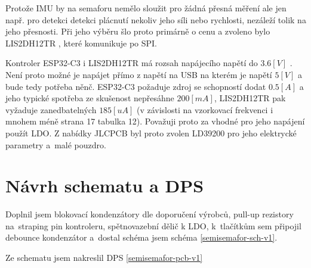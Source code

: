 Protože IMU by na semaforu nemělo sloužit pro žádná přesná měření ale jen např. pro detekci detekci plácnutí nekoliv jeho síli nebo rychlosti, nezáleží tolik na jeho přesnosti.
Při jeho výběru šlo proto primárně o cenu a zvoleno bylo LIS2DH12TR \cite{LIS2DH12TR}, které komunikuje po SPI.

Kontroler ESP32-C3 i LIS2DH12TR má rozsah napájecího napětí do \(3.6 [V]\) \cite{ESP32C3}\cite{LIS2DH12TR}.
Není proto možné je napájet přímo z napětí na USB na kterém je napětí \(5 [V]\) a bude tedy potřeba něnč.
ESP32-C3 požaduje zdroj se schopností dodat \(0.5 [A]\) \cite{ESP32C3} a jeho typické spotřeba ze skušenost nepřesáhne \(200 [mA]\), LIS2DH12TR pak vyžaduje zanedbatelných \(185 [uA]\) (v závislosti na vzorkovací frekvenci i mnohem méně \cite{LIS2DH12TR} strana 17 tabulka 12).
Považuji proto za vhodné pro jeho napájení použít LDO.
Z nabídky JLCPCB byl proto zvolen LD39200 \cite{LD39200} pro jeho elektrycké parametry a~malé pouzdro.

\section{Návrh schematu a DPS}

Doplnil jsem blokovací kondenzátory dle doporučení výrobců, pull-up rezistory na~straping pin kontroleru, spětnovazební dělič k LDO, k~tlačítkům sem připojil debounce kondenzátor a~dostal schéma jsem schéma \ref{semisemafor-sch-v1}.

Ze schematu jsem nakreslil DPS \ref{semisemafor-pcb-v1}

